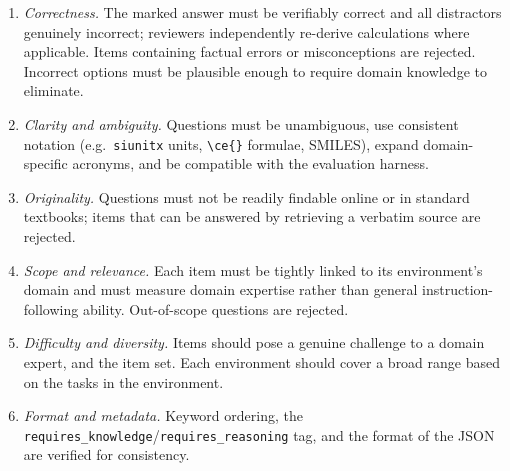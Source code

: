 \begin{enumerate}
  \item \textit{Correctness.}
    The marked answer must be verifiably correct and all distractors genuinely
    incorrect; reviewers independently re-derive calculations where applicable.
    Items containing factual errors or misconceptions are rejected. Incorrect options must be plausible enough to require domain knowledge to
    eliminate.
    
 
  \item \textit{Clarity and ambiguity.}
    Questions must be unambiguous, use consistent notation (e.g.\
    \texttt{siunitx} units, \verb|\ce{}| formulae, SMILES), expand
    domain-specific acronyms, and be compatible with the evaluation harness.
 
  \item \textit{Originality.}
    Questions must not be readily findable online or in standard textbooks;
    items that can be answered by retrieving a verbatim source are rejected.
 
  \item \textit{Scope and relevance.}
    Each item must be tightly linked to its environment's domain and must
    measure domain expertise rather than general instruction-following ability.
    Out-of-scope questions are rejected.
 
  \item \textit{Difficulty and diversity.}
    Items should pose a genuine challenge to a domain expert, and the item set. Each environment should cover a broad range based on the tasks in the environment.
 
  \item \textit{Format and metadata.}
    Keyword ordering, the \texttt{requires\_knowledge}/\texttt{requires\_reasoning} tag, and the format of the JSON are verified for consistency.
\end{enumerate}



\begin{table}[H]
    \centering
    \caption{\textbf{Example knowledge-based questions.} For each environment, one representative factual question is shown, testing domain-specific knowledge required to operate the environment. The correct answer is indicated in the last column.}
    \label{tab:qa-know-examples}
    \resizebox{\textwidth}{!}{
    
    }
\end{table}


\begin{table}[H]
    \centering
    \tiny
    \caption{\textbf{Example reasoning-based questions.} For each environment, one representative reasoning question is shown, requiring multi-step inference over observations or domain concepts. Answer options are truncated for brevity. The correct answer is indicated in the last column.}
    \label{tab:qa-reas-examples}
    \resizebox{\textwidth}{!}{
    
    }
\end{table}

